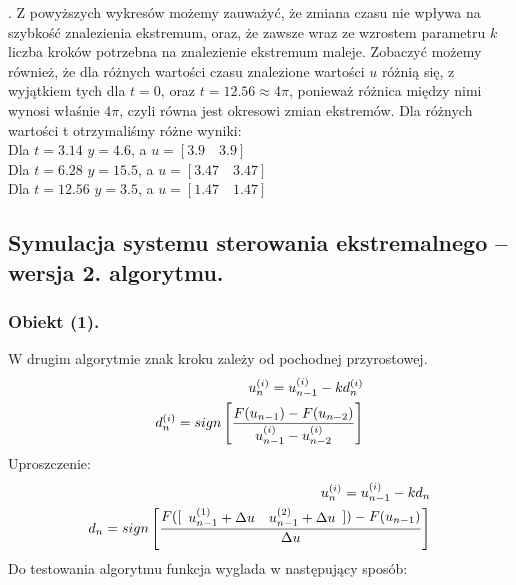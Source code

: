 \documentclass[a4paper,10pt]{article}
\begin{document}
\newpage . \newpage Z powyższych wykresów możemy zauważyć, że zmiana czasu nie wpływa na szybkość znalezienia ekstremum, oraz, że zawsze wraz ze wzrostem parametru $k$ liczba kroków potrzebna na znalezienie ekstremum maleje. Zobaczyć możemy również, że dla różnych wartości czasu znalezione wartości $u$ różnią się, z wyjątkiem tych dla $t=0$, oraz $t=12.56 \approx 4\pi$, ponieważ różnica między nimi wynosi właśnie $4\pi$, czyli równa jest okresowi zmian ekstremów.
\newpage Dla różnych wartości t otrzymaliśmy różne wyniki:\\
Dla $t=3.14$ $y=4.6$, a $u=[3.9 \quad 3.9]$\\
Dla $t=6.28$ $y=15.5$, a $u=[3.47 \quad 3.47]$\\
Dla $t=12.56$ $y=3.5$, a $u=[1.47 \quad 1.47]$


\subsection{Symulacja systemu sterowania ekstremalnego – wersja 2. algorytmu.}

\subsubsection{Obiekt (1).}
W drugim algorytmie znak kroku zależy od pochodnej przyrostowej.
\begin{eqnarray}
	u_n^{(i)} = u_{n-1}^{(i)}-kd_n^{(i)}\\
	d_n^{(i)} = sign \left[ {F(u_{n-1}) - F(u_{n-2}) \over u_{n-1}^{(i)} - u_{n-2}^{(i)}} \right] 
\end{eqnarray}
Uproszczenie:
\begin{eqnarray}
	u_n^{(i)} = u_{n-1}^{(i)}-kd_n\\
	d_n = sign \left[ {F([\begin{array}{ll} u_{n-1}^{(1)} + \Delta u & u_{n-1}^{(2)} + \Delta u\end{array}]) - F(u_{n-1}) \over \Delta u}\right] 
\end{eqnarray}
Do testowania algorytmu funkcja wyglada w następujący sposób:


\end{document}
